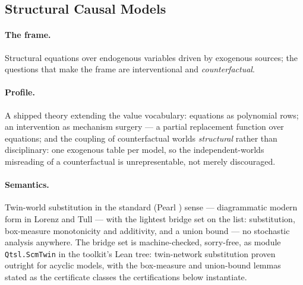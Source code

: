 \subsection{Structural Causal Models}
\label{sec:mt-scm}

\paragraph{The frame.} Structural equations over endogenous
variables driven by exogenous sources; the questions that make the
frame are interventional and \emph{counterfactual}.

\paragraph{Profile.} A shipped theory extending the value vocabulary:
equations as polynomial rows; an intervention as mechanism surgery
--- a partial replacement function over equations; and the coupling
of counterfactual worlds \emph{structural} rather than disciplinary:
one exogenous table per model, so the independent-worlds misreading
of a counterfactual is unrepresentable, not merely discouraged.

\paragraph{Semantics.} Twin-world substitution in the standard
(Pearl \cite{pearl-2009}) sense --- diagrammatic modern
form in Lorenz and Tull \cite{lorenz23} --- with the lightest bridge
set on the list:
substitution, box-measure monotonicity and additivity, and a union
bound --- no stochastic analysis anywhere. The bridge set is
machine-checked, sorry-free, as module \texttt{Qtsl.ScmTwin} in the
toolkit's Lean tree: twin-network substitution proven outright for
acyclic models, with the box-measure and union-bound lemmas stated
as the certificate classes the certifications below instantiate.

